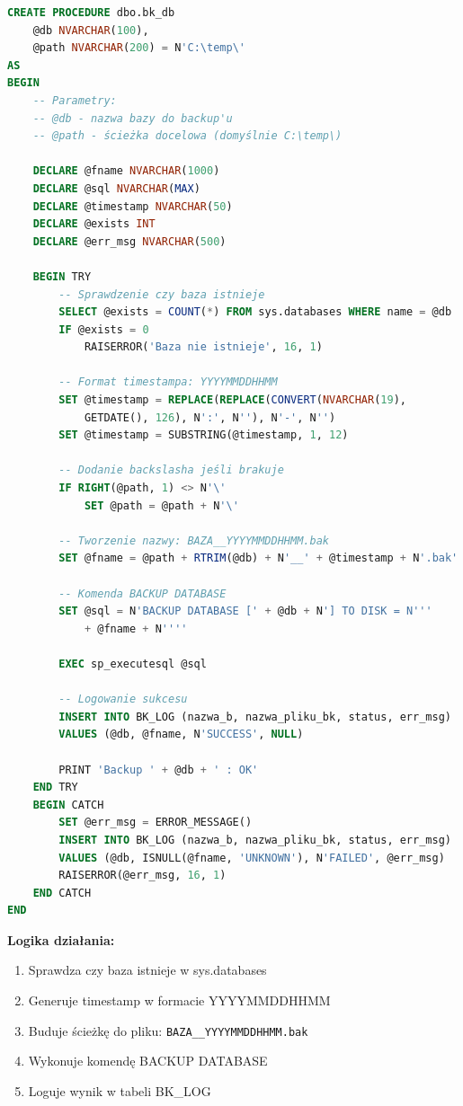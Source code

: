 \documentclass[a4paper,11pt]{article}
\begin{document}
	\begin{lstlisting}[language=SQL]
CREATE PROCEDURE dbo.bk_db
	@db NVARCHAR(100),
	@path NVARCHAR(200) = N'C:\temp\'
AS
BEGIN
	-- Parametry:
	-- @db - nazwa bazy do backup'u
	-- @path - ścieżka docelowa (domyślnie C:\temp\)
	
	DECLARE @fname NVARCHAR(1000)
	DECLARE @sql NVARCHAR(MAX)
	DECLARE @timestamp NVARCHAR(50)
	DECLARE @exists INT
	DECLARE @err_msg NVARCHAR(500)
	
	BEGIN TRY
		-- Sprawdzenie czy baza istnieje
		SELECT @exists = COUNT(*) FROM sys.databases WHERE name = @db
		IF @exists = 0
			RAISERROR('Baza nie istnieje', 16, 1)
		
		-- Format timestampa: YYYYMMDDHHMM
		SET @timestamp = REPLACE(REPLACE(CONVERT(NVARCHAR(19), 
			GETDATE(), 126), N':', N''), N'-', N'')
		SET @timestamp = SUBSTRING(@timestamp, 1, 12)
		
		-- Dodanie backslasha jeśli brakuje
		IF RIGHT(@path, 1) <> N'\'
			SET @path = @path + N'\'
		
		-- Tworzenie nazwy: BAZA__YYYYMMDDHHMM.bak
		SET @fname = @path + RTRIM(@db) + N'__' + @timestamp + N'.bak'
		
		-- Komenda BACKUP DATABASE
		SET @sql = N'BACKUP DATABASE [' + @db + N'] TO DISK = N''' 
			+ @fname + N''''
		
		EXEC sp_executesql @sql
		
		-- Logowanie sukcesu
		INSERT INTO BK_LOG (nazwa_b, nazwa_pliku_bk, status, err_msg)
		VALUES (@db, @fname, N'SUCCESS', NULL)
		
		PRINT 'Backup ' + @db + ' : OK'
	END TRY
	BEGIN CATCH
		SET @err_msg = ERROR_MESSAGE()
		INSERT INTO BK_LOG (nazwa_b, nazwa_pliku_bk, status, err_msg)
		VALUES (@db, ISNULL(@fname, 'UNKNOWN'), N'FAILED', @err_msg)
		RAISERROR(@err_msg, 16, 1)
	END CATCH
END
	\end{lstlisting}
	
	\textbf{Logika działania:}
	\begin{enumerate}
		\item Sprawdza czy baza istnieje w sys.databases
		\item Generuje timestamp w formacie YYYYMMDDHHMM
		\item Buduje ścieżkę do pliku: \texttt{BAZA\_\_YYYYMMDDHHMM.bak}
		\item Wykonuje komendę BACKUP DATABASE
		\item Loguje wynik w tabeli BK\_LOG
	\end{enumerate}
	
\end{document}

